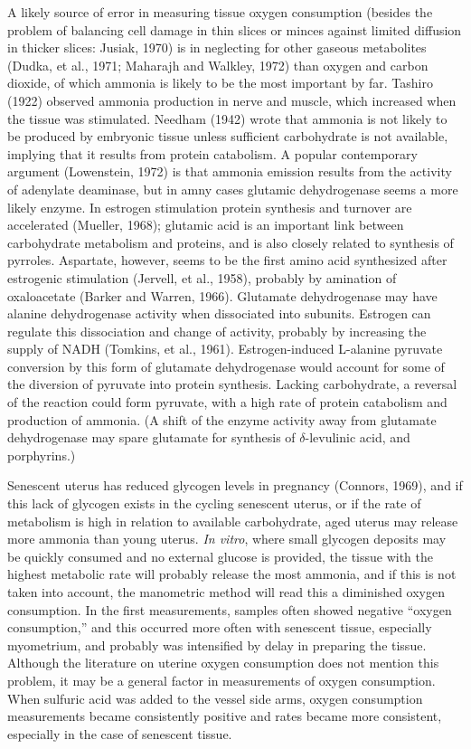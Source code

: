 A likely source of error in measuring tissue oxygen consumption (besides the problem of balancing cell damage in thin slices or minces against limited diffusion in thicker slices: Jusiak, 1970) is in neglecting for other gaseous metabolites (Dudka, et al., 1971; Maharajh and Walkley, 1972) than oxygen and carbon dioxide, of which ammonia is likely to be the most important by far. Tashiro (1922) observed ammonia production in nerve and muscle, which increased when the tissue was stimulated. Needham (1942) wrote that ammonia is not likely to be produced by embryonic tissue unless sufficient carbohydrate is not available, implying that it results from protein catabolism. A popular contemporary argument (Lowenstein, 1972) is that ammonia emission results from the activity of adenylate deaminase, but in amny cases glutamic dehydrogenase seems a more likely enzyme. In estrogen stimulation protein synthesis and turnover are accelerated (Mueller, 1968); glutamic acid is an important link between carbohydrate metabolism and proteins, and is also closely related to synthesis of pyrroles. Aspartate, however, seems to be the first amino acid synthesized after estrogenic stimulation (Jervell, et al., 1958), probably by amination of oxaloacetate (Barker and Warren, 1966). Glutamate dehydrogenase may have alanine dehydrogenase activity when dissociated into subunits. Estrogen can regulate this dissociation and change of activity, probably by increasing the supply of NADH (Tomkins, et al., 1961). Estrogen-induced L-alanine pyruvate conversion by this form of glutamate dehydrogenase would account for some of the diversion of pyruvate into protein synthesis. Lacking carbohydrate, a reversal of the reaction could form pyruvate, with a high rate of protein catabolism and production of ammonia. (A shift of the enzyme activity away from glutamate dehydrogenase may spare glutamate for synthesis of $\delta$-levulinic acid, and porphyrins.)

Senescent uterus has reduced glycogen levels in pregnancy (Connors, 1969), and if this lack of glycogen exists in the cycling senescent uterus, or if the rate of metabolism is high in relation to available carbohydrate, aged uterus may release more ammonia than young uterus. \textit{In vitro}, where small glycogen deposits may be quickly consumed and no external glucose is provided, the tissue with the highest metabolic rate will probably release the most ammonia, and if this is not taken into account, the manometric method will read this a diminished oxygen consumption. In the first measurements, samples often showed negative ``oxygen consumption,'' and this occurred more often with senescent tissue, especially myometrium, and probably was intensified by delay in preparing the tissue. Although the literature on uterine oxygen consumption does not mention this problem, it may be a general factor in measurements of oxygen consumption. When sulfuric acid was added to the vessel side arms, oxygen consumption measurements became consistently positive and rates became more consistent, especially in the case of senescent tissue.

